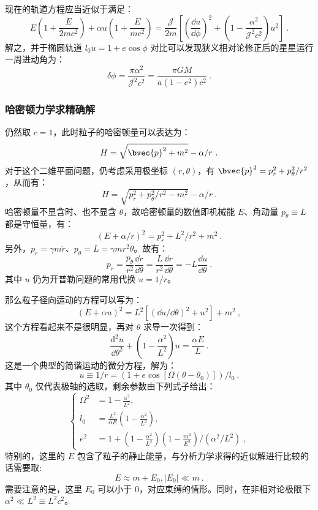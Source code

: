 现在的轨道方程应当近似于满足：
\begin{equation}
E\left(1 + \frac{E}{2mc^2}\right) + \alpha u \left(1 + \frac{E}{mc^2}\right) = \frac{\mathcal J}{2m} \left[ \left(\frac{\dd u}{\dd \phi}\right)^2 + \left( 1-\frac{\alpha^2}{\mathcal J^2 c^2} \right) u^2 \right]~.
\end{equation}
解之，并于椭圆轨道 $l_0 u = 1 + e \cos \phi$ 对比可以发现狭义相对论修正后的星星运行一周进动角为：
\begin{equation}
\delta \phi = \frac{\pi \alpha^2}{\mathcal J^2c^2} = \frac{\pi G M}{a (1-e^2) c^2} ~.
\end{equation}


\subsubsection{哈密顿力学求精确解}
仍然取 $c=1$，此时粒子的哈密顿量可以表达为：
$$H = \sqrt{\bvec{p}^2 + m^2} - \alpha/r ~.$$
对于这个二维平面问题，仍考虑采用极坐标 $(r, \theta)$，有 $\bvec{p}^2 = p_r^2 + p_\theta^2/r^2$，从而有：
$$H = \sqrt{p_r^2+p_\theta^2/r^2 -m^2}-\alpha/r ~.$$
哈密顿量不显含时、也不显含 $\theta$，故哈密顿量的数值即机械能 $E$、角动量 $p_\theta \equiv  L$ 都是守恒量，有：
$$\left(E + \alpha/r\right) ^2 = p_r^2 + L^2/r^2 + m^2 ~.$$
另外，$p_r = \gamma m \dot r$、$p_\theta = L = \gamma m r^2 \dot \theta$。故有：
$$p_r = \frac{p_\theta}{r^2}\frac{\dd r}{\dd \theta} = \frac{L}{r^2} \frac{\dd r}{\dd \theta} = -L \frac{\dd u}{\dd \theta} ~.$$
其中 $u$ 仍为开普勒问题的常用代换 $u = 1/r$。

那么粒子径向运动的方程可以写为：
$$ (E+\alpha u)^2 = L^2 [(\dd u/\dd \theta)^2 + u^2] + m^2 ~,$$
这个方程看起来不是很明显，再对 $\theta$ 求导一次得到：
$$\frac{\mathrm{d}^2 u}{{\dd \theta ^2}} + \left(1-\frac{\alpha^2}{L^2}\right) u = \frac{\alpha E}{L} ~.$$
这是一个典型的简谐运动的微分方程，解为：
$$u \equiv 1/r = (1 + e \cos[\Omega (\theta - \theta_0)])/l_0 ~.$$
其中 $\theta_0$ 仅代表极轴的选取，剩余参数由下列式子给出：
\begin{equation}
\left \{
\begin{aligned}
\Omega^2 &= 1-\frac{\alpha^2}{L^2}, \\
l_0 &= \frac{L^2}{\alpha E} \left( 1-\frac{\alpha^2}{L^2} \right), \\ 
e^2 &= 1 + {\left(1-\frac{\alpha^2}{L^2}\right) \left(1-\frac{m^2}{E^2}\right)/(\alpha^2 / L^2) } ~,
\end{aligned}
\right .
\end{equation}
特别的，这里的 $E$ 包含了粒子的静止能量，与分析力学求得的近似解进行比较的话需要取:
$$E \approx m + E_0, |E_0| \ll m ~.$$
需要注意的是，这里 $E_0$ 可以小于 $0$，对应束缚的情形。同时，在非相对论极限下 $\alpha^2 \ll L^2 \equiv L^2c^2$。
